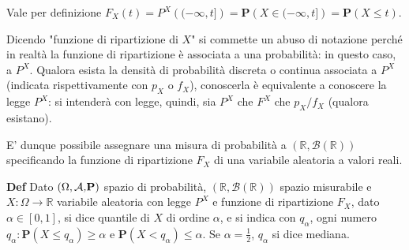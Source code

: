 \documentclass{article}
\begin{document}
Vale per definizione $F_{X}\left( t\right) =P^{X}\left( (-\infty ,t]\right) =%
\mathbf{P}\left( X\in (-\infty ,t]\right) =\mathbf{P}\left( X\leq t\right) $.

Dicendo "funzione di ripartizione di $X$" si commette un abuso di notazione
perch\'{e} in realt\`{a} la funzione di ripartizione \`{e} associata a una
probabilit\`{a}: in questo caso, a $P^{X}$. Qualora esista la densit\`{a} di
probabilit\`{a} discreta o continua associata a $P^{X}$ (indicata
rispettivamente con $p_{X}$ o $f_{X}$), conoscerla \`{e} equivalente a
conoscere la legge $P^{X}$: si intender\`{a} con legge, quindi, sia $P^{X}$
che $F^{X}$ che $p_{X}/f_{X}$ (qualora esistano).

E' dunque possibile assegnare una misura di probabilit\`{a} a $\left( 
\mathbb{R}
,\mathcal{B}\left( 
\mathbb{R}
\right) \right) $ specificando la funzione di ripartizione $F_{X}$ di una
variabile aleatoria a valori reali.

\textbf{Def} Dato $\left( \Omega ,\mathcal{A}\emph{,}\mathbf{P}\right) $
spazio di probabilit\`{a}, $\left( 
\mathbb{R}
,\mathcal{B}\left( 
\mathbb{R}
\right) \right) $ spazio misurabile e $X:\Omega \rightarrow 
\mathbb{R}
$ variabile aleatoria con legge $P^{X}$ e funzione di ripartizione $F_{X}$,
dato $\alpha \in \left[ 0,1\right] $, si dice quantile di $X$ di ordine $%
\alpha $, e si indica con $q_{\alpha }$, ogni numero $q_{\alpha }:\mathbf{P}%
\left( X\leq q_{\alpha }\right) \geq \alpha $ e $\mathbf{P}\left(
X<q_{\alpha }\right) \leq \alpha $. Se $\alpha =\frac{1}{2}$, $q_{\alpha }$
si dice mediana.
\end{document}
